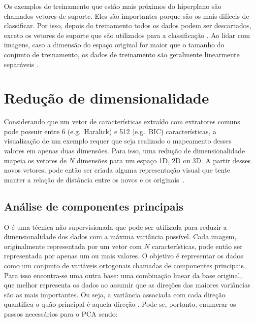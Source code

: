 Os exemplos de treinamento que estão mais próximos do hiperplano são chamados vetores de suporte. Eles são importantes porque são os mais difíceis de classificar. Por isso, depois do treinamento todos os dados podem ser descartados, exceto os vetores de suporte que são utilizados para a classificação \cite{Marsland2015}. Ao lidar com imagens, caso a dimensão do espaço original for maior que o tamanho do conjunto de treinamento, os dados de treinamento são geralmente linearmente separáveis \cite{Chapelle1999a}.

\section{Redução de dimensionalidade}
\label{sec:reducaodimensionalidade}

Considerando que um vetor de características extraído com extratores comuns pode possuir entre 6 (e.g.\ Haralick) e 512 (e.g.\ BIC) características, a visualização de um exemplo requer que seja realizado o mapeamento desses valores em apenas duas dimensões. Para isso, uma redução de dimensionalidade mapeia os vetores de $N$ dimensões para um espaço 1D, 2D ou 3D. A partir desses novos vetores, pode então ser criada alguma representação visual que tente manter a relação de distância entre os novos e os originais~\cite{Paulovich2007}.

\subsection{Análise de componentes principais}
\label{sec:pca}


O  é uma técnica não supervisionada que pode ser utilizada para reduzir a dimensionalidade dos dados com a máxima variância possível. Cada imagem, originalmente representada por um vetor com $N$ características, pode então ser representada por apenas um ou mais valores.  O objetivo é representar os dados como um conjunto de variáveis ortogonais chamadas de componentes principais. Para isso encontra-se uma outra base: uma combinação linear da base original, que melhor representa os dados ao assumir que as direções das maiores variâncias são as mais importantes. Ou seja, a variância associada com cada direção quantifica o quão principal é aquela direção \cite{Abdi2010}. Pode-se, portanto, enumerar os passos necessários para o PCA sendo:


